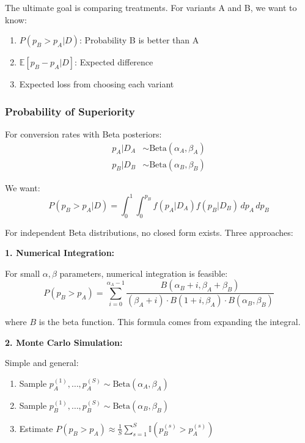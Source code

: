 The ultimate goal is comparing treatments. For variants A and B, we want to know:
\begin{enumerate}
    \item $P(p_B > p_A | D)$: Probability B is better than A
    \item $\mathbb{E}[p_B - p_A | D]$: Expected difference
    \item Expected loss from choosing each variant
\end{enumerate}

\subsubsection{Probability of Superiority}

For conversion rates with Beta posteriors:
\begin{align}
p_A | D_A &\sim \text{Beta}(\alpha_A, \beta_A) \\
p_B | D_B &\sim \text{Beta}(\alpha_B, \beta_B)
\end{align}

We want:
\begin{equation}
P(p_B > p_A | D) = \int_0^1 \int_0^{p_B} f(p_A | D_A) f(p_B | D_B) \, dp_A \, dp_B
\end{equation}

For independent Beta distributions, no closed form exists. Three approaches:

\textbf{1. Numerical Integration:}

For small $\alpha, \beta$ parameters, numerical integration is feasible:
\begin{equation}
P(p_B > p_A) = \sum_{i=0}^{\alpha_A - 1} \frac{B(\alpha_B + i, \beta_A + \beta_B)}{(\beta_A + i) \cdot B(1 + i, \beta_A) \cdot B(\alpha_B, \beta_B)}
\end{equation}

where $B$ is the beta function. This formula comes from expanding the integral.

\textbf{2. Monte Carlo Simulation:}

Simple and general:
\begin{enumerate}
    \item Sample $p_A^{(1)}, \ldots, p_A^{(S)} \sim \text{Beta}(\alpha_A, \beta_A)$
    \item Sample $p_B^{(1)}, \ldots, p_B^{(S)} \sim \text{Beta}(\alpha_B, \beta_B)$
    \item Estimate $P(p_B > p_A) \approx \frac{1}{S}\sum_{s=1}^S \mathbb{I}(p_B^{(s)} > p_A^{(s)})$
\end{enumerate}

